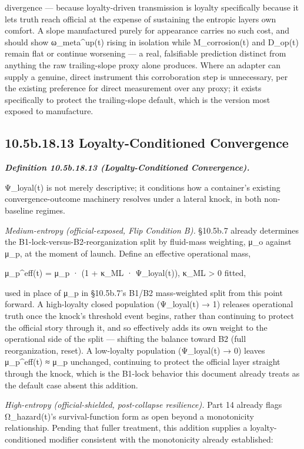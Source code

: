 \documentclass[
]{article}
\begin{document}
divergence --- because loyalty-driven transmission is loyalty
specifically because it lets truth reach official at the expense of
sustaining the entropic layer\textquotesingle s own comfort. A slope
manufactured purely for appearance carries no such cost, and should show
ω\_meta\^{}up(t) rising in isolation while M\_corrosion(t) and D\_op(t)
remain flat or continue worsening --- a real, falsifiable prediction
distinct from anything the raw trailing-slope proxy alone produces.
Where an adapter can supply a genuine, direct instrument this
corroboration step is unnecessary, per the existing preference for
direct measurement over any proxy; it exists specifically to protect the
trailing-slope default, which is the version most exposed to
manufacture.

\hypertarget{b.18.13-loyalty-conditioned-convergence}{%
\subsection{10.5b.18.13 Loyalty-Conditioned
Convergence}\label{b.18.13-loyalty-conditioned-convergence}}

\emph{\textbf{Definition 10.5b.18.13 (Loyalty-Conditioned
Convergence).}}

Ψ\_loyal(t) is not merely descriptive; it conditions how a container's
existing convergence-outcome machinery resolves under a lateral knock,
in both non-baseline regimes.

\emph{Medium-entropy (official-exposed, Flip Condition B).} §10.5b.7
already determines the B1-lock-versus-B2-reorganization split by
fluid-mass weighting, μ\_o against μ\_p, at the moment of launch. Define
an effective operational mass,

μ\_p\^{}eff(t) = μ\_p · (1 + κ\_ML · Ψ\_loyal(t)), κ\_ML \textgreater{}
0 fitted,

used in place of μ\_p in §10.5b.7's B1/B2 mass-weighted split from this
point forward. A high-loyalty closed population (Ψ\_loyal(t) → 1)
releases operational truth once the knock's threshold event begins,
rather than continuing to protect the official story through it, and so
effectively adds its own weight to the operational side of the split ---
shifting the balance toward B2 (full reorganization, reset). A
low-loyalty population (Ψ\_loyal(t) → 0) leaves μ\_p\^{}eff(t) ≈ μ\_p
unchanged, continuing to protect the official layer straight through the
knock, which is the B1-lock behavior this document already treats as the
default case absent this addition.

\emph{High-entropy (official-shielded, post-collapse resilience).} Part
14 already flags Ω\_hazard(t)'s survival-function form as open beyond a
monotonicity relationship. Pending that fuller treatment, this addition
supplies a loyalty-conditioned modifier consistent with the monotonicity
already established:
\end{document}
